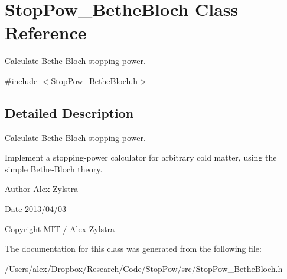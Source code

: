\hypertarget{class_stop_pow___bethe_bloch}{\section{Stop\-Pow\-\_\-\-Bethe\-Bloch Class Reference}
\label{class_stop_pow___bethe_bloch}
}


Calculate Bethe-\/\-Bloch stopping power.  




{\ttfamily \#include $<$Stop\-Pow\-\_\-\-Bethe\-Bloch.\-h$>$}



\subsection{Detailed Description}
Calculate Bethe-\/\-Bloch stopping power. 

Implement a stopping-\/power calculator for arbitrary cold matter, using the simple Bethe-\/\-Bloch theory.

\begin{DoxyAuthor}{Author}
Alex Zylstra 
\end{DoxyAuthor}
\begin{DoxyDate}{Date}
2013/04/03 
\end{DoxyDate}
\begin{DoxyCopyright}{Copyright}
M\-I\-T / Alex Zylstra 
\end{DoxyCopyright}


The documentation for this class was generated from the following file\-:\begin{DoxyCompactItemize}
\item 
/\-Users/alex/\-Dropbox/\-Research/\-Code/\-Stop\-Pow/src/Stop\-Pow\-\_\-\-Bethe\-Bloch.\-h\end{DoxyCompactItemize}
